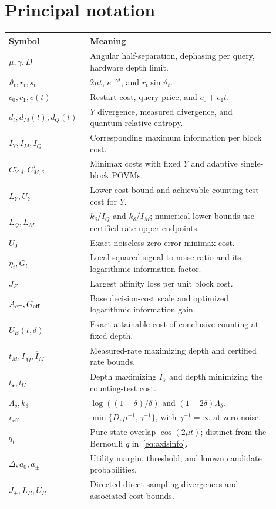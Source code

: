 \documentclass[11pt,a4paper]{article}
\newcommand{\reff}{r_{\mathrm{eff}}}
\theoremstyle{definition}
\theoremstyle{remark}
\numberwithin{equation}{section}
\begin{document}
\section{Principal notation}
\begin{center}\small
\begin{tabular}{p{0.25\linewidth}p{0.65\linewidth}}
\toprule Symbol & Meaning\\\midrule
$\mu,\gamma,D$ & Angular half-separation, dephasing per query, hardware depth limit.\\
$\vartheta_t,r_t,s_t$ & $2\mu t$, $e^{-\gamma t}$, and $r_t\sin\vartheta_t$.\\
$c_0,c_1,c(t)$ & Restart cost, query price, and $c_0+c_1t$.\\
$d_t,d_M(t),d_Q(t)$ & $Y$ divergence, measured divergence, and quantum relative entropy.\\
$I_Y,I_M,I_Q$ & Corresponding maximum information per block cost.\\
$C_{Y,\delta}^\star,C_{M,\delta}^\star$ & Minimax costs with fixed $Y$ and adaptive single-block POVMs.\\
$L_Y,U_Y$ & Lower cost bound and achievable counting-test cost for $Y$.\\
$L_Q,L_M$ & $k_\delta/I_Q$ and $k_\delta/I_M$; numerical lower bounds use certified rate upper endpoints.\\
$U_0$ & Exact noiseless zero-error minimax cost.\\
$\eta_t,G_t$ & Local squared-signal-to-noise ratio and its logarithmic information factor.\\
$J_F$ & Largest affinity loss per unit block cost.\\
$A_{\rm eff},G_{\rm eff}$ & Base decision-cost scale and optimized logarithmic information gain.\\
$U_E(t,\delta)$ & Exact attainable cost of conclusive counting at fixed depth.\\
$t_M,\underline I_M,\overline I_M$ & Measured-rate maximizing depth and certified rate bounds.\\
$t_\star,t_U$ & Depth maximizing $I_Y$ and depth minimizing the counting-test cost.\\
$\Lambda_\delta,k_\delta$ & $\log((1-\delta)/\delta)$ and $(1-2\delta)\Lambda_\delta$.\\
$\reff$ & $\min\{D,\mu^{-1},\gamma^{-1}\}$, with $\gamma^{-1}=\infty$ at zero noise.\\
$q_t$ & Pure-state overlap $\cos(2\mu t)$; distinct from the Bernoulli $q$ in~\eqref{eq:axisinfo}.\\
$\Delta,a_0,a_\pm$ & Utility margin, threshold, and known candidate probabilities.\\
$J_\pm,L_R,U_R$ & Directed direct-sampling divergences and associated cost bounds.\\
\bottomrule\end{tabular}
\end{center}
\end{document}
